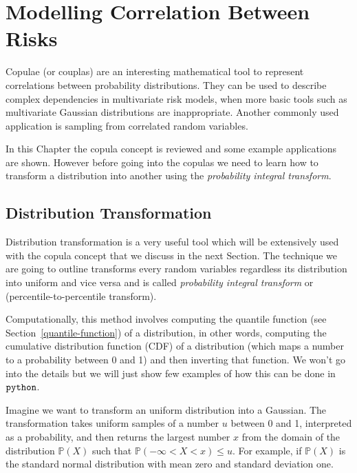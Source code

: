 \chapter{Modelling Correlation Between Risks}

Copulae (or couplas) are an interesting mathematical tool to represent correlations between probability distributions. They can be used to describe complex dependencies in multivariate risk models, when more basic tools such as multivariate Gaussian distributions are inappropriate. Another commonly used application is sampling from correlated random variables.

In this Chapter the copula concept is reviewed and some example applications are shown. However before going into the copulas we need to learn how to transform a distribution into another using the \emph{probability integral transform}. 


\section{Distribution Transformation}\label{distribution-transformation}

Distribution transformation is a very useful tool which will be
extensively used with the copula concept that we discuss in the next
Section. The technique we are going to outline transforms every random
variables regardless its distribution into uniform and vice versa and is called
\emph{probability integral transform} or (percentile-to-percentile
transform).

Computationally, this method involves computing the quantile function (see Section~\ref{quantile-function}) of
a distribution, in other words, computing the cumulative
distribution function (CDF) of a distribution (which maps a number
to a probability between 0 and 1) and then inverting that
function. We won't go into the details but we will just show few
examples of how this can be done in \(\tt{python}\).

Imagine we want to transform an uniform distribution into a Gaussian.
The transformation takes uniform samples of a number \(u\) between 0 and
1, interpreted as a probability, and then returns the largest number
\(x\) from the domain of the distribution \(\mathbb{P}(X)\) such that
\(\mathbb{P}(-\infty <X<x)\le u\). For example, if \(\mathbb{P}(X)\) is the 
standard normal distribution with mean zero and
standard deviation one. 

